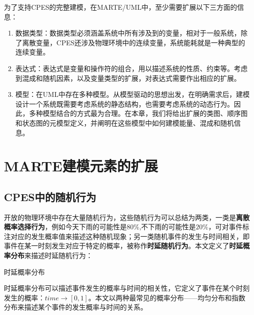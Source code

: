 	为了支持CPES的完整建模，在MARTE/UML中，至少需要扩展以下三方面的信息\citep{DBLP:conf/apsec/YaoLZW15}：
	\begin{enumerate}
	\item 数据类型：数据类型必须涵盖系统中所有涉及到的变量，相对于一般系统，除了离散变量，CPES还涉及物理环境中的连续变量，系统能耗就是一种典型的连续变量。
	\item 表达式：表达式是变量和操作符的组合，用以描述系统的性质、约束等。考虑到混成和随机因素，以及变量类型的扩展，对表达式需要作出相应的扩展。
	\item 模型：在UML中存在多种模型。从模型驱动的思想出发，在明确需求后，建模设计一个系统既需要考虑系统的静态结构，也需要考虑系统的动态行为。因此，多种模型结合的方式最为合理。在本章，我们将给出扩展的类图、顺序图和状态图的元模型定义，并阐明在这些模型中如何建模能量、混成和随机信息。
	\end{enumerate}
	
\section{MARTE建模元素的扩展}
		
	

\subsection{CPES中的随机行为}
	开放的物理环境中存在大量随机行为，这些随机行为可以总结为两类，一类是\textbf{离散概率选择行为}，例如今天下雨的可能性是$80\%$,不下雨的可能性是$20\%$，可对事件标注对应的发生概率值来描述这种随机现象；另一类随机事件的发生与时间相关，即事件在某一时刻发生对应于特定的概率，被称作\textbf{时延随机行为}。本文定义了\textbf{时延概率分布}来描述时延随机行为：
	\begin{myDef}时延概率分布\end{myDef}
	时延概率分布可以描述事件发生的概率与时间的相关性，它定义了事件在某个时刻发生的概率：$time \rightarrow [0,1]$。本文以两种最常见的概率分布——均匀分布和指数分布来描述某个事件的发生概率与时间的关系。
	
